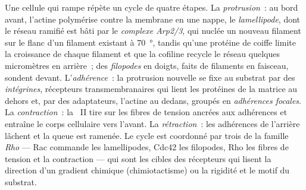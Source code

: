 \begin{definition}\label{def:b3:cytoskeleton-motility:migration}
Une cellule qui rampe répète un cycle de quatre étapes. La
\emph{protrusion}~: au bord avant, l'actine polymérise contre la
membrane en une nappe, le \emph{lamellipode}, dont le réseau ramifié est
bâti par le \emph{complexe Arp2/3}, qui nuclée un nouveau filament sur
le flanc d'un filament existant à \qty{70}{\degree}, tandis qu'une
protéine de coiffe limite la croissance de chaque filament et que la
cofiline recycle le réseau quelques micromètres en arrière~; des
\emph{filopodes} en doigts, faits de filaments en faisceau, sondent
devant. L'\emph{adhérence}~: la protrusion nouvelle se fixe au substrat
par des \emph{intégrines}, récepteurs transmembranaires qui lient les
protéines de la matrice au dehors et, par des adaptateurs, l'actine au
dedans, groupés en \emph{adhérences focales}. La
\emph{contraction}~: la ~II tire sur les fibres de tension
ancrées aux adhérences et entraîne le corps cellulaire vers l'avant. La
\emph{rétraction}~: les adhérences de l'arrière lâchent et la queue est
ramenée. Le cycle est coordonné par trois  de la famille
\emph{Rho} --- Rac commande les lamellipodes, Cdc42 les filopodes, Rho
les fibres de tension et la contraction --- qui sont les cibles des
récepteurs qui lisent la direction d'un gradient chimique
(chimiotactisme) ou la rigidité et le motif du substrat.
\end{definition}


